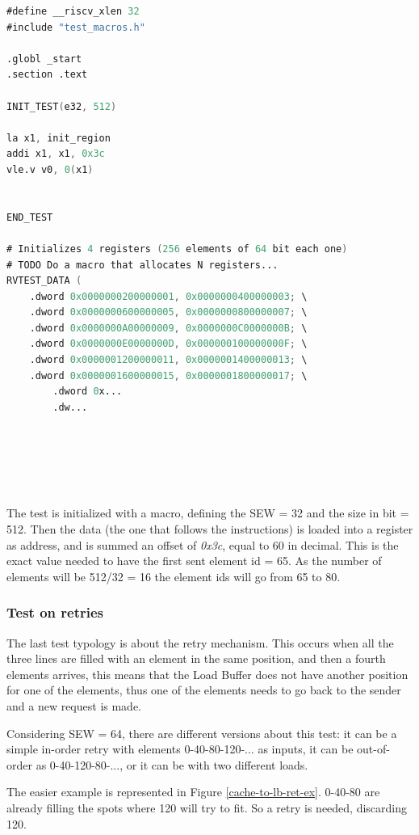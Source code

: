 \linespread{1}
\begin{lstlisting}[language=Verilog,style=verilog-style, backgroundcolor=\color{lyel_palette}, frame=tl]
#define __riscv_xlen 32
#include "test_macros.h"

.globl _start
.section .text

INIT_TEST(e32, 512)

la x1, init_region
addi x1, x1, 0x3c
vle.v v0, 0(x1)


END_TEST

# Initializes 4 registers (256 elements of 64 bit each one)
# TODO Do a macro that allocates N registers...
RVTEST_DATA (
	.dword 0x0000000200000001, 0x0000000400000003; \
	.dword 0x0000000600000005, 0x0000000800000007; \
	.dword 0x0000000A00000009, 0x0000000C0000000B; \
	.dword 0x0000000E0000000D, 0x000000100000000F; \
	.dword 0x0000001200000011, 0x0000001400000013; \
	.dword 0x0000001600000015, 0x0000001800000017; \
        .dword 0x...
        .dw...  

     
 

        
\end{lstlisting}
\linespread{1.2}

The test is initialized with a macro, defining the SEW = 32 and the size in bit = 512.
Then the data (the one that follows the instructions) is loaded into a register as address, and is summed an offset of \emph{0x3c}, equal to 60 in decimal. This is the exact value needed to have the first sent element id = 65. As the number of elements will be 512/32 = 16 the element ids will go from 65 to 80.

\subsubsection{Test on retries}
The last test typology is about the retry mechanism. This occurs when all the three lines are filled with an element in the same position, and then a fourth elements arrives, this means that the Load Buffer does not have another position for one of the elements, thus one of the elements needs to go back to the sender and a new request is made.

Considering SEW = 64, there are different versions about this test: it can be a simple in-order retry with elements 0-40-80-120-... as inputs, it can be out-of-order as 0-40-120-80-..., or it can be with two different loads.

The easier example is represented in Figure \ref{cache-to-lb-ret-ex}. 0-40-80 are already filling the spots where 120 will try to fit. So a retry is needed, discarding 120.

